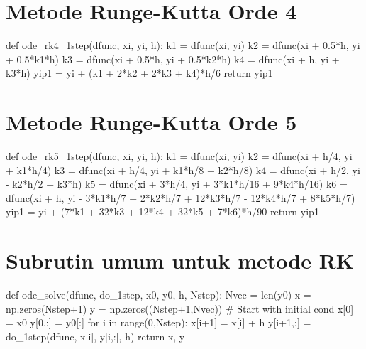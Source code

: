 \section{Metode Runge-Kutta Orde 4}

\begin{pythoncode}
def ode_rk4_1step(dfunc, xi, yi, h):
    k1 = dfunc(xi, yi)
    k2 = dfunc(xi + 0.5*h, yi + 0.5*k1*h)
    k3 = dfunc(xi + 0.5*h, yi + 0.5*k2*h)
    k4 = dfunc(xi + h, yi + k3*h)
    yip1 = yi + (k1 + 2*k2 + 2*k3 + k4)*h/6
    return yip1
\end{pythoncode}


\section{Metode Runge-Kutta Orde 5}

\begin{pythoncode}
def ode_rk5_1step(dfunc, xi, yi, h):
    k1 = dfunc(xi, yi)
    k2 = dfunc(xi + h/4, yi + k1*h/4)
    k3 = dfunc(xi + h/4, yi + k1*h/8 + k2*h/8)
    k4 = dfunc(xi + h/2, yi - k2*h/2 + k3*h)
    k5 = dfunc(xi + 3*h/4, yi + 3*k1*h/16 + 9*k4*h/16)
    k6 = dfunc(xi + h, yi - 3*k1*h/7 + 2*k2*h/7 + 12*k3*h/7 - 12*k4*h/7 + 8*k5*h/7)
    yip1 = yi + (7*k1 + 32*k3 + 12*k4 + 32*k5 + 7*k6)*h/90
    return yip1
\end{pythoncode}


\section{Subrutin umum untuk metode RK}

\begin{pythoncode}
def ode_solve(dfunc, do_1step, x0, y0, h, Nstep):
    Nvec = len(y0)
    x = np.zeros(Nstep+1)
    y = np.zeros((Nstep+1,Nvec))
    # Start with initial cond
    x[0] = x0
    y[0,:] = y0[:]
    for i in range(0,Nstep):
        x[i+1] = x[i] + h
        y[i+1,:] = do_1step(dfunc, x[i], y[i,:], h)
    return x, y
\end{pythoncode}

